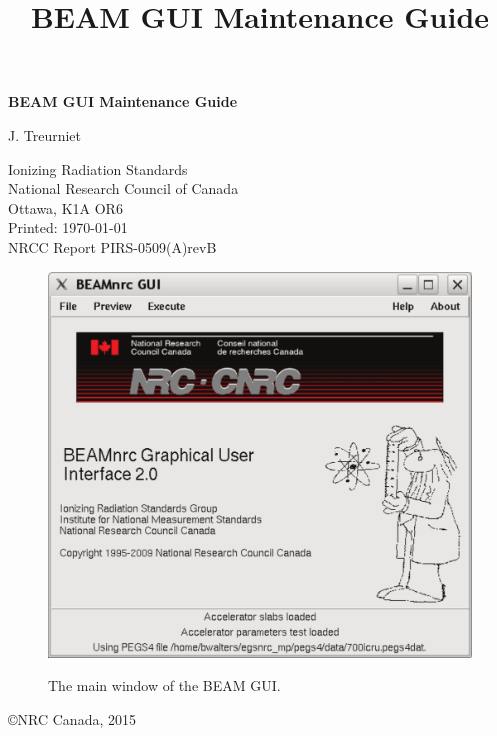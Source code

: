 \documentclass[12pt]{book}
\begin{document}
\title{BEAM GUI Maintenance Guide}
\begin{center}
{\sffamily \bfseries \Huge BEAM GUI Maintenance Guide \vspace{5mm}\\}
\begin{large}
J. Treurniet\\
\end{large}
Ionizing Radiation Standards\\
National Research Council of Canada
\\Ottawa, K1A OR6\\

Printed: \today  \\
\hfill NRCC Report {\sf PIRS-0509(A)revB}\\

\vskip 0.6in

\begin{figure}[htbp]
\begin{center}
\leavevmode
\includegraphics[width=12cm]{figures/gui_main_window}

The main window of the BEAM GUI.
\end{center}
\end{figure}


\vfill
\copyright NRC Canada, 2015
\end{center}

\setlength{\baselineskip}{0.2cm}
\newpage

\pagestyle{fancy}
\setcounter{page}{2}
\end{document}
